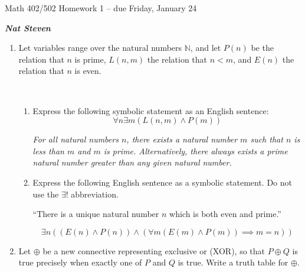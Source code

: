 \documentclass[11pt]{amsart}
\def\bbN{{\mathbb N}}
\begin{document}
\begin{spacing}{1.2}
\begin{center}
{\Large Math 402/502 Homework 1 -- due Friday, January 24}

\vspace{.5em}
\textbf{\emph{Nat Steven}}
\ \\
\end{center}

%
 \begin{enumerate}

\item Let variables range over the natural numbers $\bbN$, and let $P(n)$ be the relation that $n$ is prime, $L(n,m)$ the relation that $n<m$, and $E(n)$ the relation that $n$ is even. 

\ 
\begin{enumerate}
\item Express the following symbolic statement as an English sentence:
\[ \forall n \exists m (L(n,m) \wedge P(m)) \]

\vspace{1em}
\emph{For all natural numbers $n$, there exists a natural number $m$ such that $n$ is less than $m$ and $m$ is prime.
Alternatively, there always exists a prime natural number greater than any given natural number.}

\vfill
\item Express the following English sentence as a symbolic statement. Do not use the $\exists !$ abbreviation.

``There is a unique natural number $n$ which is both even and prime.''

\vspace{1em}

\[
 \exists n ((E(n) \wedge P(n)) \wedge (\forall m (E(m) \wedge P(m)) \implies m=n))
\]


\vfill
\end{enumerate}

\newpage

\item Let $\oplus$ be a new connective representing exclusive or (XOR), so that $P \oplus Q$ is true precisely when exactly one of $P$ and $Q$ is true. Write a truth table for $\oplus$.


\end{enumerate}
\end{spacing}
\end{document}
